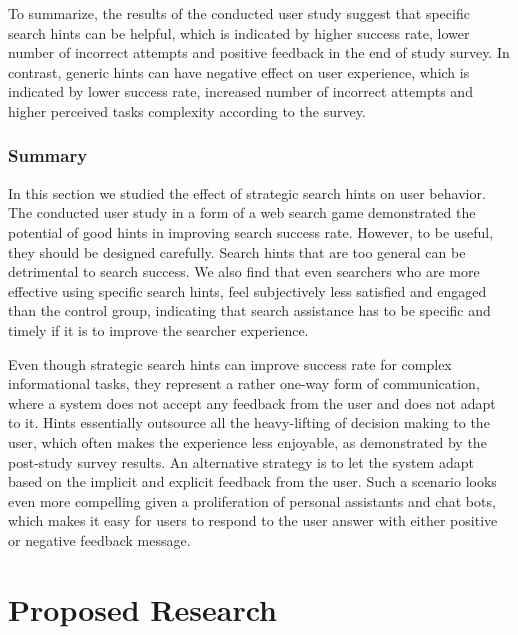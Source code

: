 To summarize, the results of the conducted user study suggest that specific search hints can be helpful, which is indicated by higher success rate, lower number of incorrect attempts and positive feedback in the end of study survey.
In contrast, generic hints can have negative effect on user experience, which is indicated by lower success rate, increased number of incorrect attempts and higher perceived tasks complexity according to the survey.

\subsubsection{Summary}
\label{section:users:hints:summary}

In this section we studied the effect of strategic search hints on user behavior. 
The conducted user study in a form of a web search game demonstrated the potential of good hints in improving search success rate.
However, to be useful, they should be designed carefully.
Search hints that are too general can be detrimental to search success.
We also find that even searchers who are more effective using specific search hints, feel subjectively less satisfied and engaged than the control group, indicating that search assistance has to be specific and timely if it is to improve the searcher experience.

Even though strategic search hints can improve success rate for complex informational tasks, they represent a rather one-way form of communication, where a system does not accept any feedback from the user and does not adapt to it.
Hints essentially outsource all the heavy-lifting of decision making to the user, which often makes the experience less enjoyable, as demonstrated by the post-study survey results.
An alternative strategy is to let the system adapt based on the implicit and explicit feedback from the user.
Such a scenario looks even more compelling given a proliferation of personal assistants and chat bots, which makes it easy for users to respond to the user answer with either positive or negative feedback message.


\section{Proposed Research}
\label{section:users:proposal}

